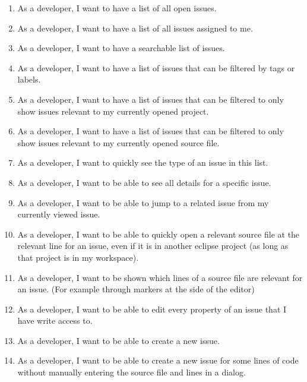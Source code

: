 \begin{enumerate}
	\item As a developer, I want to have a list of all open issues. \label{itm:ch3:req:filter_open}
	\item As a developer, I want to have a list of all issues assigned to me. \label{itm:ch3:req:filter_me}
	\item As a developer, I want to have a searchable list of issues. \label{itm:ch3:req:filter_search}
	\item As a developer, I want to have a list of issues that can be filtered by tags or labels. \label{itm:ch3:req:filter_labels}
	\item As a developer, I want to have a list of issues that can be filtered to only show issues relevant to my currently opened project. \label{itm:ch3:req:filter_open project}
	\item As a developer, I want to have a list of issues that can be filtered to only show issues relevant to my currently opened source file. \label{itm:ch3:req:filter_open_file}
	\item As a developer, I want to quickly see the type of an issue in this list. \label{itm:ch3:req:list_issue_type}
	\item As a developer, I want to be able to see all details for a specific issue.
	\item As a developer, I want to be able to jump to a related issue from my currently viewed issue.
	\item As a developer, I want to be able to quickly open a relevant source file at the relevant line for an issue, even if it is in another eclipse project (as long as that project is in my workspace).
	\item As a developer, I want to be shown which lines of a source file are relevant for an issue. (For example through markers at the side of the editor) \label{itm:ch3:req:source_file_marker}
	\item As a developer, I want to be able to edit every property of an issue that I have write access to.
	\item As a developer, I want to be able to create a new issue.
	\item As a developer, I want to be able to create a new issue for some lines of code without manually entering the source file and lines in a dialog.
	\setcounter{enumarteCounter}{\value{enumi}} %
\end{enumerate}


